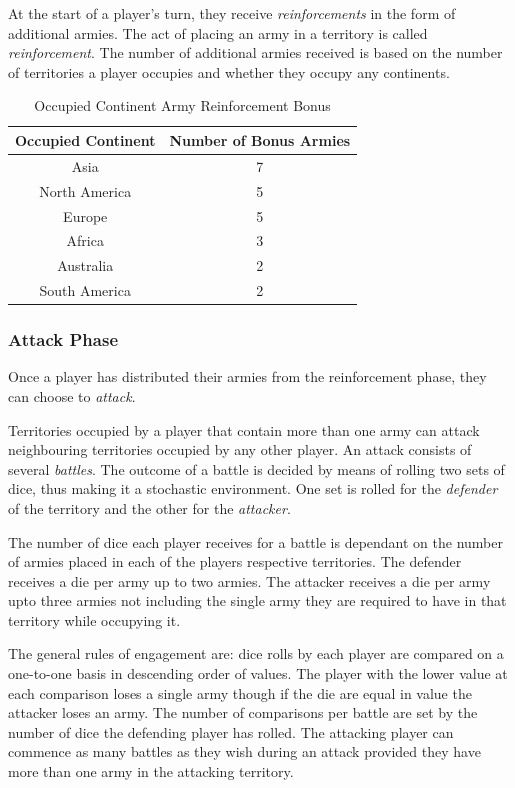 \documentclass[parskip]{cs4rep}
\begin{document}
At the start of a player's turn, they receive \textit{reinforcements} in the form of additional armies. The act of placing an army in a territory is called \textit{reinforcement}.  The number of additional armies received is based on the number of territories a player occupies and whether they occupy any continents.

\begin{table}[ht]
\centering
\begin{tabular}{|c|c|}
\hline 
\textbf{Occupied Continent} & \textbf{Number of Bonus Armies} \\ 
\hline 
Asia & 7 \\ 
\hline 
North America & 5 \\ 
\hline 
Europe & 5 \\ 
\hline 
Africa & 3 \\
\hline
Australia & 2 \\
\hline  
South America & 2 \\
\hline 
\end{tabular}
\caption{Occupied Continent Army Reinforcement Bonus}
\label{table:continent-bonus}
\end{table}

\subsubsection{Attack Phase}

Once a player has distributed their armies from the reinforcement phase, they can choose to \textit{attack}. 

Territories occupied by a player that contain more than one army can attack neighbouring territories occupied by any other player. An attack consists of several \textit{battles}. The outcome of a battle is decided by means of rolling two sets of dice, thus making it a stochastic environment. One set is rolled for the \textit{defender} of the territory and the other for the \textit{attacker}. 

The number of dice each player receives for a battle is dependant on the number of armies placed in each of the players respective territories. The defender receives a die per army up to two armies. The attacker receives a die per army upto three armies not including the single army they are required to have in that territory while occupying it. 

The general rules of engagement are: dice rolls by each player are compared on a one-to-one basis in descending order of values. The player with the lower value at each comparison loses a single army though if the die are equal in value the attacker loses an army. The number of comparisons per battle are set by the number of dice the defending player has rolled. The attacking player can commence as many battles as they wish during an attack provided they have more than one army in the attacking territory.
\end{document}
